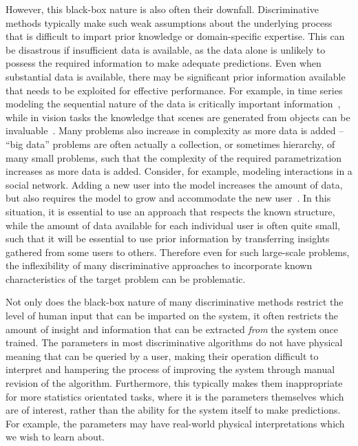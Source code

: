However, this black-box nature is also often their downfall.  Discriminative methods typically make
such weak assumptions about the underlying process that is difficult to impart prior knowledge
or domain-specific expertise.  This can be disastrous if insufficient data is available, as the data
alone is unlikely to possess the required information to make adequate predictions.  Even when
substantial data is available, there may be significant prior information available that needs to be
exploited for effective performance.  For example, in time series modeling the sequential nature
of the data is critically important information~\citep{liu1998sequential}, while in vision tasks the 
knowledge that scenes are generated from objects can be invaluable~\citep{kulkarni2015picture}.
Many problems also increase in complexity as more data is added -- ``big data'' problems are often
actually a collection, or sometimes hierarchy, of many small problems, such that the complexity of the
required parametrization increases as more data is added.  Consider, for example, modeling interactions in
a social network.  Adding a new user into the model increases the amount of data, but also
requires the model to grow and accommodate the new user~\citep{ravasz2003hierarchical}.  In
this situation, it is essential to
use an approach that respects the known structure, while the amount of data available
for each individual user is often quite small, such that it will be essential to use prior information
by transferring insights gathered from some users to others.  Therefore even for such large-scale
problems, the inflexibility of many discriminative approaches to incorporate known characteristics
of the target problem can be problematic.

Not only does the black-box nature of many discriminative methods restrict the level of
human input that can be imparted on the system, it often restricts the amount of insight
and information that can be extracted \emph{from} the system once trained.  The parameters in most discriminative
algorithms do not have physical meaning that can be queried by a user, making their operation
difficult to interpret and hampering the process of improving the system through manual
revision of the algorithm.  Furthermore, this typically makes them inappropriate for more
statistics orientated tasks, where it is the parameters themselves which are of interest, rather
than the ability for the system itself to make predictions.  For example, the parameters may
have real-world physical interpretations which we wish to learn about.

